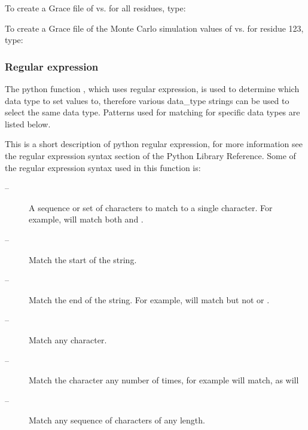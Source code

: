 To create a Grace file of  vs.  for all residues, type:





To create a Grace file of the Monte Carlo simulation values of  vs.  for residue 123, type:





\subsubsection{Regular expression}

The python function , which uses regular expression, is used to determine which data type to set values to, therefore various data\_type strings can be used to select the same data type.  Patterns used for matching for specific data types are listed below.


This is a short description of python regular expression, for more information see the regular expression syntax section of the Python Library Reference.  Some of the regular expression syntax used in this function is:


\begin{description}
\item[\quotecmd{[]} --]  A sequence or set of characters to match to a single character.  For example,  will match both  and . 
\item[\quotecmd{\^{}} --]  Match the start of the string. 
\item[\quotecmd{\$} --]  Match the end of the string.  For example,  will match  but not  or . 
\item[ --]  Match any character. 
\item[ --]  Match the character  any number of times, for example  will match, as will  
\item[ --]  Match any sequence of characters of any length. 
\end{description}


